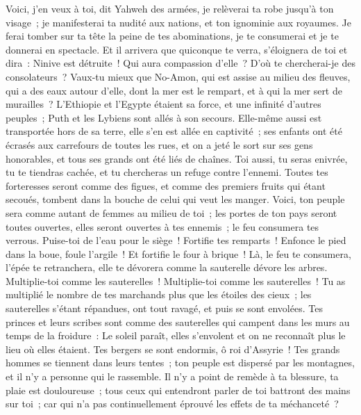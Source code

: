 \begin{multicols}{2}
Voici, j'en veux à toi, dit Yahweh des armées, je relèverai ta robe jusqu'à ton visage~; je manifesterai ta nudité aux nations, et ton ignominie aux royaumes.
Je ferai tomber sur ta tête la peine de tes abominations, je te consumerai et je te donnerai en spectacle.
Et il arrivera que quiconque te verra, s'éloignera de toi et dira~: Ninive est détruite~! Qui aura compassion d'elle~? D'où te chercherai-je des consolateurs~?
Vaux-tu mieux que No-Amon, qui est assise au milieu des fleuves, qui a des eaux autour d'elle, dont la mer est le rempart, et à qui la mer sert de murailles~?
L'Ethiopie et l'Egypte étaient sa force, et une infinité d'autres peuples~; Puth et les Lybiens sont allés à son secours.
Elle-même aussi est transportée hors de sa terre, elle s'en est allée en captivité~; ses enfants ont été écrasés aux carrefours de toutes les rues, et on a jeté le sort sur ses gens honorables, et tous ses grands ont été liés de chaînes.
Toi aussi, tu seras enivrée, tu te tiendras cachée, et tu chercheras un refuge contre l'ennemi.
Toutes tes forteresses seront comme des figues, et comme des premiers fruits qui étant secoués, tombent dans la bouche de celui qui veut les manger.
Voici, ton peuple sera comme autant de femmes au milieu de toi~; les portes de ton pays seront toutes ouvertes, elles seront ouvertes à tes ennemis~; le feu consumera tes verrous.
Puise-toi de l'eau pour le siège~! Fortifie tes remparts~! Enfonce le pied dans la boue, foule l'argile~! Et fortifie le four à brique~!
Là, le feu te consumera, l'épée te retranchera, elle te dévorera comme la sauterelle dévore les arbres. Multiplie-toi comme les sauterelles~! Multiplie-toi comme les sauterelles~!
Tu as multiplié le nombre de tes marchands plus que les étoiles des cieux~; les sauterelles s'étant répandues, ont tout ravagé, et puis se sont envolées.
Tes princes et leurs scribes sont comme des sauterelles qui campent dans les murs au temps de la froidure~: Le soleil paraît, elles s'envolent et on ne reconnaît plus le lieu où elles étaient.
Tes bergers se sont endormis, ô roi d'Assyrie~! Tes grands hommes se tiennent dans leurs tentes~; ton peuple est dispersé par les montagnes, et il n'y a personne qui le rassemble.
Il n'y a point de remède à ta blessure, ta plaie est douloureuse~; tous ceux qui entendront parler de toi battront des mains sur toi~; car qui n'a pas continuellement éprouvé les effets de ta méchanceté~?
\PPE{}
\end{multicols}
